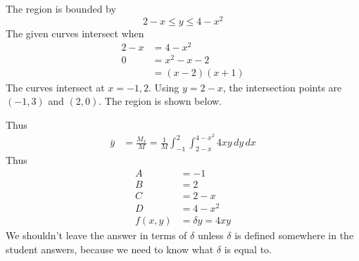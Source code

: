     \ifnum {} 
    {\color{DarkBlue}
    The region is bounded by 
    $$2-x \le y \le 4-x^2$$
    The given curves intersect when 
    \begin{align}
        2-x &= 4-x^2\\
        0 &= x^2-x-2 \\
        &= (x-2)(x+1)
    \end{align}
    The curves intersect at $x=-1,2$. Using $y=2-x$, the intersection points are $(-1,3)$ and $(2,0)$. The region is shown below. 
    \begin{center}  
    \end{center}   
        
    Thus
    \begin{align}
        \bar y &= \frac{M_x}M = \frac1M \int_{-1}^{2}\int_{2-x}^{4-x^2} 4xy \, dy \, dx
    \end{align} 
    Thus
    \begin{align}
        A &= -1 \\
        B &= 2 \\
        C&= 2-x \\
        D&= 4-x^2 \\
        f(x,y) &= \delta y = 4xy
    \end{align}
    We shouldn't leave the answer in terms of $\delta$ unless $\delta$ is defined somewhere in the student answers, because we need to know what $\delta$ is equal to. 
    }
   \else

   \fi
    
\fi




